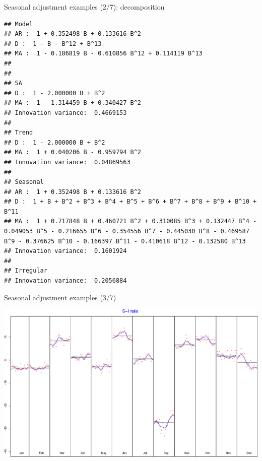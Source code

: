 \documentclass[10pt,xcolor=table,color={dvipsnames,usenames},ignorenonframetext,usepdftitle=false,french]{beamer}
\newenvironment{Shaded}{\begin{snugshade}}{\end{snugshade}}
\newcommand{\KeywordTok}[1]{\textcolor[rgb]{0.13,0.29,0.53}{\textbf{#1}}}
\newcommand{\NormalTok}[1]{#1}
\newcommand{\OperatorTok}[1]{\textcolor[rgb]{0.81,0.36,0.00}{\textbf{#1}}}
\begin{document}
\begin{frame}[fragile]{Seasonal adjustment examples (2/7):
decomposition}
\protect\hypertarget{seasonal-adjustment-examples-27-decomposition}{}

\footnotesize

\begin{Shaded}
\end{Shaded}

\begin{verbatim}
## Model
## AR :  1 + 0.352498 B + 0.133616 B^2 
## D :  1 - B - B^12 + B^13 
## MA :  1 - 0.186819 B - 0.610856 B^12 + 0.114119 B^13 
## 
## 
## SA
## D :  1 - 2.000000 B + B^2 
## MA :  1 - 1.314459 B + 0.340427 B^2 
## Innovation variance:  0.4669153 
## 
## Trend
## D :  1 - 2.000000 B + B^2 
## MA :  1 + 0.040206 B - 0.959794 B^2 
## Innovation variance:  0.04869563 
## 
## Seasonal
## AR :  1 + 0.352498 B + 0.133616 B^2 
## D :  1 + B + B^2 + B^3 + B^4 + B^5 + B^6 + B^7 + B^8 + B^9 + B^10 + B^11 
## MA :  1 + 0.717848 B + 0.460721 B^2 + 0.310085 B^3 + 0.132447 B^4 - 0.049053 B^5 - 0.216655 B^6 - 0.354556 B^7 - 0.445030 B^8 - 0.469587 B^9 - 0.376625 B^10 - 0.166397 B^11 - 0.410618 B^12 - 0.132580 B^13 
## Innovation variance:  0.1601924 
## 
## Irregular
## Innovation variance:  0.2056884
\end{verbatim}

\end{frame}

\begin{frame}[fragile]{Seasonal adjustment examples (3/7)}
\protect\hypertarget{seasonal-adjustment-examples-37}{}

\begin{Shaded}
\end{Shaded}

\includegraphics{img/markdown-unnamed-chunk-9-1.pdf}

\end{frame}
\end{document}

